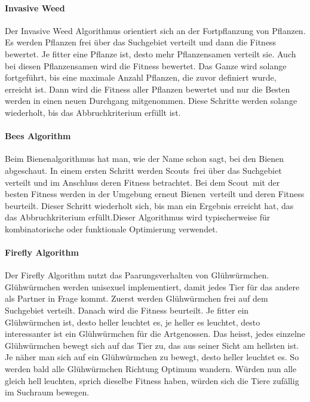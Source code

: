 		\paragraph{Invasive Weed}
		$\;$ \\
		Der Invasive Weed Algorithmus orientiert sich an der Fortpflanzung von Pflanzen. Es werden Pflanzen frei über das Suchgebiet verteilt und dann die Fitness bewertet. Je fitter eine Pflanze ist, desto mehr Pflanzensamen verteilt sie. Auch bei diesen Pflanzensamen wird die Fitness bewertet. Das Ganze wird solange fortgeführt, bis eine maximale Anzahl Pflanzen, die zuvor definiert wurde, erreicht ist. Dann wird die Fitness aller Pflanzen bewertet und nur die Besten werden in einen neuen Durchgang mitgenommen. Diese Schritte werden solange wiederholt, bis das Abbruchkriterium erfüllt ist.
				
		
		\paragraph{Bees Algorithm}
		$\;$ \\
		Beim Bienenalgorithmus hat man, wie der Name schon sagt, bei den Bienen abgeschaut.
		In einem ersten Schritt werden \textacutedbl Scouts\textacutedbl \ frei über das Suchgebiet verteilt und im Anschluss deren Fitness betrachtet. Bei dem \textacutedbl Scout\textacutedbl \ mit der besten Fitness werden in der Umgebung erneut \textacutedbl Bienen\textacutedbl \ verteilt und deren Fitness beurteilt. Dieser Schritt wiederholt sich, bis man ein Ergebnis erreicht hat, das das Abbruchkriterium erfüllt.Dieser Algorithmus wird typischerweise für kombinatorische oder funktionale Optimierung verwendet.
		
		\paragraph{Firefly Algorithm} 
		$\;$ \\
		Der Firefly Algorithm nutzt das Paarungsverhalten von Glühwürmchen. Glühwürmchen werden unisexuel implementiert, damit jedes Tier für das andere als Partner in Frage kommt. 
		Zuerst werden Glühwürmchen frei auf dem Suchgebiet verteilt. Danach wird die Fitness beurteilt. Je fitter ein Glühwürmchen ist, desto heller leuchtet es, je heller es leuchtet, desto interessanter ist ein Glühwürmchen für die Artgenossen. Das heisst, jedes einzelne Glühwürmchen bewegt sich auf das Tier zu, das aus seiner Sicht am hellsten ist. Je näher man sich auf ein Glühwürmchen zu bewegt, desto heller leuchtet es. So werden bald alle Glühwürmchen Richtung Optimum wandern. Würden nun alle gleich hell leuchten, sprich dieselbe Fitness haben, würden sich die Tiere zufällig im Suchraum bewegen.
		
